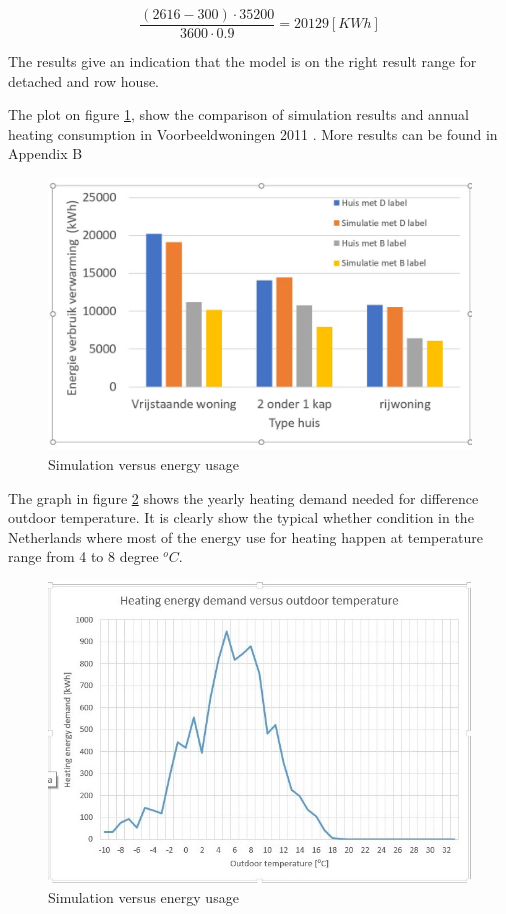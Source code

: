\begin{equation}
\frac{(2616-300) \cdot 35200}{3600\cdot 0.9}= 20129[KWh] 
\end{equation}

The results give an indication that the model is on the right result range for detached and row house.

The plot on figure \ref{fig:Simulationresults}, show the comparison of simulation results and annual heating consumption in Voorbeeldwoningen 2011 \cite{VOORBEELD}. More results can be found in Appendix B

\begin{figure}[H]
	\centering
	\includegraphics[width=1.0\columnwidth]{Pictures/Simulation results.jpg}
	\caption[Short title]{Simulation versus energy usage}
	\label{fig:Simulationresults}
	\end{figure}
\newpage

The graph in figure \ref{fig:heatingvstemp} shows the yearly heating demand needed for difference outdoor temperature.
It is clearly show the typical whether condition in the Netherlands where most of the energy use for heating happen at temperature range from 4 to 8 degree $^oC$.

\begin{figure}[H]
	\centering
	\includegraphics[width=1.0\columnwidth]{Pictures/Yearheatingdemand.jpg}
	\caption[Short title]{Simulation versus energy usage}
	\label{fig:heatingvstemp}
	\end{figure}
	
